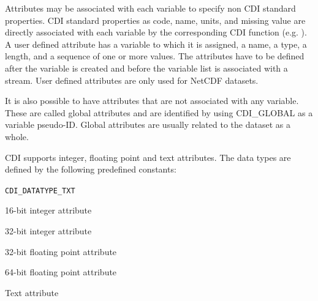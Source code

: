 Attributes may be associated with each variable to specify non
CDI standard properties. CDI standard properties as code, name,
units, and missing value are directly associated with each variable by
the corresponding CDI function (e.g. {}).
A user defined attribute has a variable to which it is assigned, a name, a type,
a length, and a sequence of one or more values.
The attributes have to be defined after the variable is created and 
before the variable list is associated with a stream.
User defined attributes are only used for NetCDF datasets.

It is also possible to have attributes that are not associated with any variable.
These are called global attributes and are identified by using CDI\_GLOBAL as a 
variable pseudo-ID. Global attributes are usually related to the dataset as a whole.

CDI supports integer, floating point and text attributes. The data types are defined 
by the following predefined constants:

\vspace*{3mm}
\hspace*{8mm}\begin{minipage}{15cm}
\begin{deflist}{\large\texttt{CDI\_DATATYPE\_TXT \ \ }}
\item[\large\texttt{CDI\_DATATYPE\_INT16}]   16-bit integer attribute
\item[\large\texttt{CDI\_DATATYPE\_INT32}]   32-bit integer attribute
\item[\large\texttt{CDI\_DATATYPE\_FLT32}]   32-bit floating point attribute
\item[\large\texttt{CDI\_DATATYPE\_FLT64}]   64-bit floating point attribute
\item[\large\texttt{CDI\_DATATYPE\_TXT}]     Text attribute
\end{deflist}
\end{minipage}
